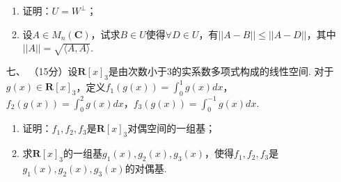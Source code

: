 \begin{enumerate}
\begin{enumerate}
        \item 证明：$U=W^{\perp}$；

        \item 设$A\in M_n(\mathbf{C})$，试求$B\in U$使得$\forall D\in U$，有$||A-B||\leqslant||A-D||$，其中$||A||=\sqrt{\langle A,A\rangle}$.
    \end{enumerate}

	\item[七、]（15分）设$\mathbf{R}[x]_3$是由次数小于3的实系数多项式构成的线性空间. 对于$g(x)\in\mathbf{R}[x]_3$，定义$f_1(g(x))=\int_0^1g(x)dx$，$f_2(g(x))=\int_0^2g(x)dx$，$f_3(g(x))=\int_0^{-1}g(x)dx$.
    \begin{enumerate}[label=(\arabic*)]
        \item 证明：$f_1,f_2,f_3$是$\mathbf{R}[x]_3$对偶空间的一组基；

        \item 求$\mathbf{R}[x]_3$的一组基$g_1(x),g_2(x),g_3(x)$，使得$f_1,f_2,f_3$是$g_1(x),g_2(x),g_3(x)$的对偶基.
    \end{enumerate}
\end{enumerate}

\clearpage
